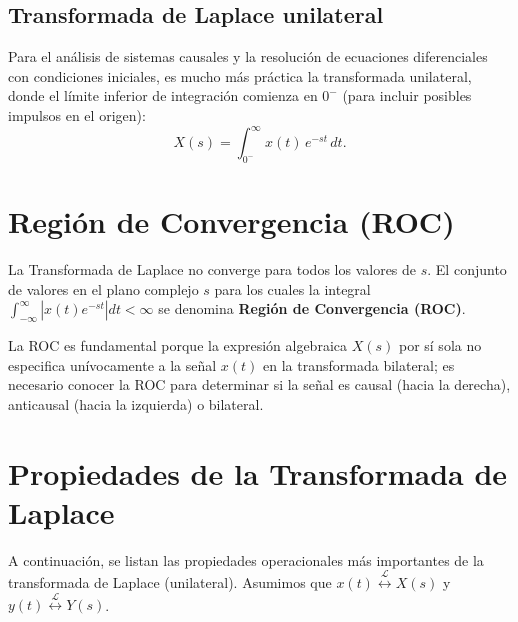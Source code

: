 \subsection{Transformada de Laplace unilateral}

Para el análisis de sistemas causales y la resolución de ecuaciones diferenciales con condiciones iniciales, es mucho más práctica la transformada unilateral, donde el límite inferior de integración comienza en $0^{-}$ (para incluir posibles impulsos en el origen):
\begin{equation}
	X(s) = \int_{0^{-}}^{\infty} x(t) \, e^{-st} \, dt.
\end{equation}

\section{Región de Convergencia (ROC)}

La Transformada de Laplace no converge para todos los valores de $s$. El conjunto de valores en el plano complejo $s$ para los cuales la integral $\int_{-\infty}^{\infty} |x(t) e^{-st}| dt < \infty$ se denomina \textbf{Región de Convergencia (ROC)}. 

La ROC es fundamental porque la expresión algebraica $X(s)$ por sí sola no especifica unívocamente a la señal $x(t)$ en la transformada bilateral; es necesario conocer la ROC para determinar si la señal es causal (hacia la derecha), anticausal (hacia la izquierda) o bilateral.

\section{Propiedades de la Transformada de Laplace}

A continuación, se listan las propiedades operacionales más importantes de la transformada de Laplace (unilateral). Asumimos que $x(t) \stackrel{\mathcal{L}}{\longleftrightarrow} X(s)$ y $y(t) \stackrel{\mathcal{L}}{\longleftrightarrow} Y(s)$.

